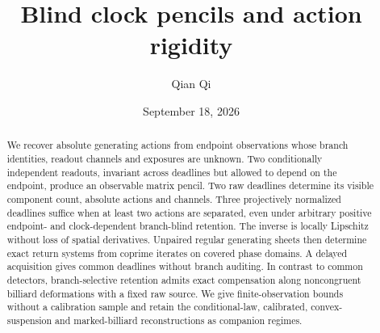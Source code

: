 
\usepackage{array}
\raggedbottom
{}
\title[Blind clock pencils and action rigidity]{Blind clock pencils and action rigidity}
\author{Qian Qi}
\date{September 18, 2026}

\begin{abstract}
We recover absolute generating actions from endpoint observations whose
branch identities, readout channels and exposures are unknown.  Two
conditionally independent readouts, invariant across deadlines but allowed
to depend on the endpoint, produce an observable matrix pencil.  Two raw
deadlines determine its visible component count, absolute actions and
channels.  Three projectively normalized deadlines suffice when at least
two actions are separated, even under arbitrary positive endpoint- and
clock-dependent branch-blind retention.  The inverse is locally Lipschitz
without loss of spatial derivatives.  Unpaired regular generating sheets
then determine exact return systems from coprime iterates on covered phase
domains.  A delayed acquisition gives common deadlines without branch
auditing.  In contrast to common detectors, branch-selective retention
admits exact compensation along noncongruent billiard deformations with a
fixed raw source.  We give finite-observation bounds without a calibration
sample and retain the conditional-law, calibrated, convex-suspension and
marked-billiard reconstructions as companion regimes.
\end{abstract}
\maketitle
\setcounter{tocdepth}{1}
\tableofcontents
